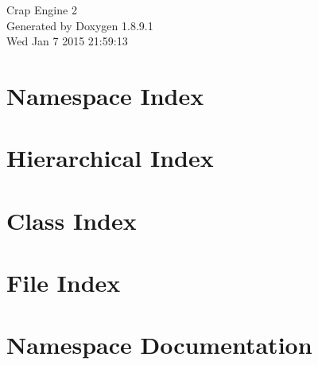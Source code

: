 \documentclass[twoside]{book}
\newcommand{\+}{\discretionary{\mbox{\scriptsize$\hookleftarrow$}}{}{}}
\newcommand{\clearemptydoublepage}{%
  \newpage{\pagestyle{empty}\cleardoublepage}%
}
\begin{document}
\hypersetup{pageanchor=false,
             bookmarks=true,
             bookmarksnumbered=true,
             pdfencoding=unicode
            }
\begin{titlepage}
\vspace*{7cm}
\begin{center}%
{\Large Crap Engine 2 }\\
\vspace*{1cm}
{\large Generated by Doxygen 1.8.9.1}\\
\vspace*{0.5cm}
{\small Wed Jan 7 2015 21:59:13}\\
\end{center}
\end{titlepage}
\clearemptydoublepage
\tableofcontents
\clearemptydoublepage
{}
\hypersetup{pageanchor=true}

\chapter{Namespace Index}

\chapter{Hierarchical Index}

\chapter{Class Index}

\chapter{File Index}

\chapter{Namespace Documentation}





\end{document}
